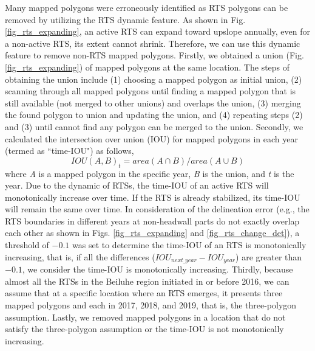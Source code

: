 \documentclass[authoryear,preprint,review,12pt]{elsarticle}
\begin{document}
Many mapped polygons were erroneously identified as RTS polygons can be removed by utilizing the RTS dynamic feature. 
As shown in Fig. \ref{fig_rts_expanding}, an active RTS can expand toward upslope annually, even for a non-active RTS, its extent cannot shrink. 
Therefore, we can use this dynamic feature to remove non-RTS mapped polygons. 
Firstly, we obtained a union (Fig. \ref{fig_rts_expanding}) of mapped polygons at the same location.
The steps of obtaining the union include (1) choosing a mapped polygon as initial union, (2) scanning through all mapped polygons until finding a mapped polygon that is still available (not merged to other unions) and overlaps the union, (3) merging the found polygon to union and updating the union, and (4) repeating steps (2) and (3) until cannot find any polygon can be merged to the union. 
Secondly, we calculated the intersection over union (IOU) for mapped polygons in each year (termed as ``time-IOU") as follows, 
\begin{equation}
IOU(A,B)_{t}=area(A \cap B)/area(A \cup B)
\label{equ_time_iou}
\end{equation}
where \emph{A} is a mapped polygon in the specific year, \emph{B} is the union, and \emph{t} is the year. 
Due to the dynamic of RTSs, the time-IOU of an active RTS will monotonically increase over time. 
If the RTS is already stabilized, its time-IOU will remain the same over time. 
In consideration of the delineation error (e.g., the RTS boundaries in different years at non-headwall parts do not exactly overlap each other as shown in Figs. \ref{fig_rts_expanding} and \ref{fig_rts_change_det}), a threshold of $-0.1$ was set to determine the time-IOU of an RTS is monotonically increasing, that is, if all the differences ($IOU_{next\_year}-IOU_{year}$) are greater than $-0.1$, we consider the time-IOU is monotonically increasing. 
Thirdly, because almost all the RTSs in the Beiluhe region initiated in or before 2016,
we can assume that at a specific location where an RTS emerges, it presents three mapped polygons and each in 2017, 2018, and 2019, that is, the three-polygon assumption. 
Lastly, we removed mapped polygons in a location that do not satisfy the three-polygon assumption or the time-IOU is not monotonically increasing.
 
\end{document}
